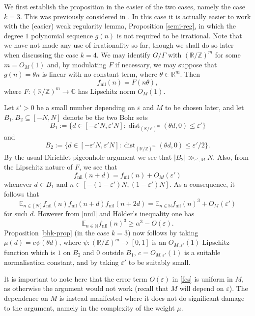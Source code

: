 \documentclass[11pt,reqno]{amsart}
\numberwithin{equation}{section}
\theoremstyle{plain}
\theoremstyle{definition}
\renewcommand{\leq}{\leqslant}
\renewcommand{\geq}{\geqslant}
\newcommand\E{{\mathbb{E}}}
\newcommand\Z{\mathbb{Z}}
\newcommand\R{\mathbb{R}}
\newcommand\C{\mathbb{C}}
\newcommand\N{\mathbb{N}}
\newcommand\1{{\bf 1}}
\newcommand\2{{\bf 2}}
\newcommand\eps{\varepsilon}
\newcommand\nil{{\operatorname{nil}}}
\newcommand\dist{{\operatorname{dist}}}
\begin{document}
We first establish the proposition in the easier of the two cases, namely the case $k=3$. This was previously considered in \cite{green-regularity}.  In this case it is actually easier to work with the (easier) weak regularity lemma, Proposition \ref{semi-reg}, in which the degree $1$ polynomial sequence $g(n)$ is not required to be irrational. Note that we have not made any use of irrationality so far, though we shall do so later when discussing the case $k = 4$. We may identify $G/\Gamma$ with $(\R/\Z)^m$ for some $m = O_M(1)$ and, by modulating $F$ if necessary, we may suppose that $g(n) = \theta n$ is linear with no constant term, where $\theta \in \R^m$. Then $$ f_\nil(n) = F( n \theta ),$$ where $ F: (\R/\Z)^m \to \C$ has Lipschitz norm $O_M(1)$.  

Let $\eps' > 0$ be a small number depending on $\eps$ and $M$ to be chosen later, and let $B_1, B_2 \subseteq [-N,N]$ denote be the two Bohr sets 
$$ B_1 := \{ d \in [-\eps' N,\eps' N]:  \dist_{(\R/\Z)^{m}}(\theta d,0) \leq \eps'\}$$
and
$$ B_2 := \{ d \in [-\eps' N, \eps' N] : \dist_{(\R/\Z)^m}(\theta d ,0) \leq \eps'/2\}.$$
By the usual Dirichlet pigeonhole argument we see that $|B_2| \gg_{\eps',M} N$.  Also, from the Lipschitz nature of  $F$, we see that
$$ f_\nil(n+d) = f_\nil(n) + O_M(\eps')$$
whenever $d \in B_1$ and $n \in [-(1-\eps')N, (1-\eps')N]$.  As a consequence, it follows that 
$$ \E_{n \in [N]} f_\nil(n) f_\nil(n+d) f_\nil(n+2d) = \E_{n \in \N} f_\nil(n)^3 + O_M(\eps')$$
for such $d$.  However from \eqref{nnil} and H\"older's inequality one has
\begin{equation}\label{fes}
 \E_{n \in \N} f_\nil(n)^3 \geq \alpha^3 - O(\eps).
\end{equation}
Proposition \ref{bhk-prop} (in the case $k = 3$) now follows by taking $\mu(d) = c \psi(\theta d)$, where $\psi : (\R/\Z)^m \rightarrow [0,1]$ is an $O_{M,\eps'}(1)$-Lipschitz function which is $1$ on $B_2$ and $0$ outside $B_1$, $c = O_{M,\eps'}(1)$ is a suitable normalisation constant, and by taking $\eps'$ to be suitably small.

It is important to note here that the error term $O(\eps)$ in \eqref{fes} is uniform in $M$, as otherwise the argument would not work (recall that $M$ will depend on $\eps$).  The dependence on $M$ is instead manifested where it does not do significant damage to the argument, namely in the complexity of the weight $\mu$.
\end{document}
